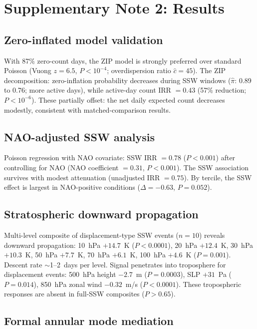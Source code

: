\documentclass[11pt,letterpaper]{article}
\begin{document}
\section{Supplementary Note 2: Results}

\subsection{Zero-inflated model validation}

With 87\% zero-count days, the ZIP model is strongly preferred over standard Poisson (Vuong $z = 6.5$, $P < 10^{-4}$; overdispersion ratio $\hat{c} = 45$). The ZIP decomposition: zero-inflation probability decreases during SSW windows ($\hat{\pi}$: 0.89 to 0.76; more active days), while active-day count IRR $= 0.43$ (57\% reduction; $P < 10^{-6}$). These partially offset: the net daily expected count decreases modestly, consistent with matched-comparison results.

\subsection{NAO-adjusted SSW analysis}

Poisson regression with NAO covariate: SSW IRR $= 0.78$ ($P < 0.001$) after controlling for NAO (NAO coefficient $= 0.31$, $P < 0.001$). The SSW association survives with modest attenuation (unadjusted IRR $= 0.75$). By tercile, the SSW effect is largest in NAO-positive conditions ($\Delta = -0.63$, $P = 0.052$).

\subsection{Stratospheric downward propagation}

Multi-level composite of displacement-type SSW events ($n = 10$) reveals downward propagation: 10~hPa $+14.7$~K ($P < 0.0001$), 20~hPa $+12.4$~K, 30~hPa $+10.3$~K, 50~hPa $+7.7$~K, 70~hPa $+6.1$~K, 100~hPa $+4.6$~K ($P = 0.001$). Descent rate $\sim$1--2~days per level. Signal penetrates into troposphere for displacement events: 500~hPa height $-2.7$~m ($P = 0.0003$), SLP $+31$~Pa ($P = 0.014$), 850~hPa zonal wind $-0.32$~m/s ($P < 0.0001$). These tropospheric responses are absent in full-SSW composites ($P > 0.65$).

\subsection{Formal annular mode mediation}
\end{document}
